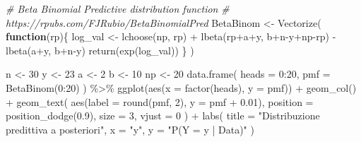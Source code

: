 \documentclass[
  10pt,
  italian,
  a4paper,
  extrafontsizes,onecolumn,openright
  ]{memoir}
\newenvironment{Shaded}{\begin{snugshade}}{\end{snugshade}}
\newcommand{\AttributeTok}[1]{\textcolor[rgb]{0.77,0.63,0.00}{#1}}
\newcommand{\CommentTok}[1]{\textcolor[rgb]{0.56,0.35,0.01}{\textit{#1}}}
\newcommand{\ControlFlowTok}[1]{\textcolor[rgb]{0.13,0.29,0.53}{\textbf{#1}}}
\newcommand{\DecValTok}[1]{\textcolor[rgb]{0.00,0.00,0.81}{#1}}
\newcommand{\FloatTok}[1]{\textcolor[rgb]{0.00,0.00,0.81}{#1}}
\newcommand{\FunctionTok}[1]{\textcolor[rgb]{0.00,0.00,0.00}{#1}}
\newcommand{\NormalTok}[1]{#1}
\newcommand{\OtherTok}[1]{\textcolor[rgb]{0.56,0.35,0.01}{#1}}
\newcommand{\SpecialCharTok}[1]{\textcolor[rgb]{0.00,0.00,0.00}{#1}}
\newcommand{\StringTok}[1]{\textcolor[rgb]{0.31,0.60,0.02}{#1}}
\begin{document}
\begin{Shaded}
\begin{Highlighting}[]
\CommentTok{\# Beta Binomial Predictive distribution function}
\CommentTok{\# https://rpubs.com/FJRubio/BetaBinomialPred}
\NormalTok{BetaBinom }\OtherTok{\textless{}{-}} \FunctionTok{Vectorize}\NormalTok{(}
  \ControlFlowTok{function}\NormalTok{(rp)\{}
\NormalTok{  log\_val }\OtherTok{\textless{}{-}} \FunctionTok{lchoose}\NormalTok{(np, rp) }\SpecialCharTok{+} 
    \FunctionTok{lbeta}\NormalTok{(rp}\SpecialCharTok{+}\NormalTok{a}\SpecialCharTok{+}\NormalTok{y, b}\SpecialCharTok{+}\NormalTok{n}\SpecialCharTok{{-}}\NormalTok{y}\SpecialCharTok{+}\NormalTok{np}\SpecialCharTok{{-}}\NormalTok{rp) }\SpecialCharTok{{-}} 
    \FunctionTok{lbeta}\NormalTok{(a}\SpecialCharTok{+}\NormalTok{y, b}\SpecialCharTok{+}\NormalTok{n}\SpecialCharTok{{-}}\NormalTok{y)}
  \FunctionTok{return}\NormalTok{(}\FunctionTok{exp}\NormalTok{(log\_val))}
\NormalTok{  \}}
\NormalTok{)}

\NormalTok{n }\OtherTok{\textless{}{-}} \DecValTok{30}
\NormalTok{y }\OtherTok{\textless{}{-}} \DecValTok{23}
\NormalTok{a }\OtherTok{\textless{}{-}} \DecValTok{2}
\NormalTok{b }\OtherTok{\textless{}{-}} \DecValTok{10}
\NormalTok{np }\OtherTok{\textless{}{-}} \DecValTok{20}
\FunctionTok{data.frame}\NormalTok{(}
  \AttributeTok{heads =} \DecValTok{0}\SpecialCharTok{:}\DecValTok{20}\NormalTok{, }
  \AttributeTok{pmf =} \FunctionTok{BetaBinom}\NormalTok{(}\DecValTok{0}\SpecialCharTok{:}\DecValTok{20}\NormalTok{)}
\NormalTok{) }\SpecialCharTok{\%\textgreater{}\%}
\FunctionTok{ggplot}\NormalTok{(}\FunctionTok{aes}\NormalTok{(}\AttributeTok{x =} \FunctionTok{factor}\NormalTok{(heads), }\AttributeTok{y =}\NormalTok{ pmf)) }\SpecialCharTok{+}
  \FunctionTok{geom\_col}\NormalTok{() }\SpecialCharTok{+}
  \FunctionTok{geom\_text}\NormalTok{(}
    \FunctionTok{aes}\NormalTok{(}\AttributeTok{label =} \FunctionTok{round}\NormalTok{(pmf, }\DecValTok{2}\NormalTok{), }\AttributeTok{y =}\NormalTok{ pmf }\SpecialCharTok{+} \FloatTok{0.01}\NormalTok{),}
    \AttributeTok{position =} \FunctionTok{position\_dodge}\NormalTok{(}\FloatTok{0.9}\NormalTok{),}
    \AttributeTok{size =} \DecValTok{3}\NormalTok{,}
    \AttributeTok{vjust =} \DecValTok{0}
\NormalTok{  ) }\SpecialCharTok{+}
  \FunctionTok{labs}\NormalTok{(}
    \AttributeTok{title =} \StringTok{"Distribuzione predittiva a posteriori"}\NormalTok{,}
    \AttributeTok{x =} \StringTok{"y\textquotesingle{}"}\NormalTok{,}
    \AttributeTok{y =} \StringTok{"P(Y = y\textquotesingle{} | Data)"}
\NormalTok{  ) }
\end{Highlighting}
\end{Shaded}
\end{document}
